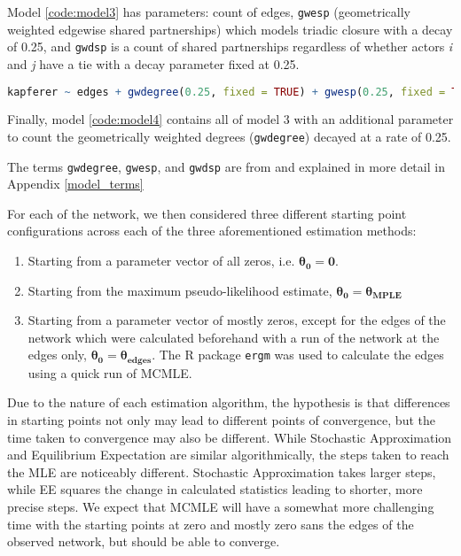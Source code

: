 Model \ref{code:model3} has parameters: count of edges, \texttt{gwesp} (geometrically weighted edgewise shared partnerships) which models triadic closure with a decay of 0.25, and \texttt{gwdsp} is a count of shared partnerships regardless of whether actors \textit{i} and \textit{j} have a tie with a decay parameter fixed at 0.25.

\begin{lstlisting}[language=R, label = {code:model4}]
kapferer ~ edges + gwdegree(0.25, fixed = TRUE) + gwesp(0.25, fixed = TRUE) + gwdsp(0.25, fixed = TRUE)
\end{lstlisting}

Finally, model \ref{code:model4} contains all of model 3 with an additional parameter to count the geometrically weighted degrees (\texttt{gwdegree}) decayed at a rate of 0.25.

The terms \texttt{gwdegree}, \texttt{gwesp}, and \texttt{gwdsp} are from \cite{hunter2007} and explained in more detail in Appendix \ref{model_terms}

For each of the network, we then considered three different starting point configurations across each of the three aforementioned estimation methods:
\begin{enumerate}
\item Starting from a parameter vector of all zeros, i.e. $\boldsymbol{\theta_0} = \boldsymbol{0}$.
\item Starting from the maximum pseudo-likelihood estimate, $\boldsymbol{\theta_0} = \boldsymbol{\theta_{MPLE}}$
\item Starting from a parameter vector of mostly zeros, except for the edges of the network which were calculated beforehand with a run of the network at the edges only, $\boldsymbol{\theta_0} = \boldsymbol{\theta_{edges}}$. The R package \texttt{ergm} was used to calculate the edges using a quick run of MCMLE.
\end{enumerate}

Due to the nature of each estimation algorithm, the hypothesis is that differences in starting points not only may lead to different points of convergence, but the time taken to convergence may also be different. While Stochastic Approximation and Equilibrium Expectation are similar algorithmically, the steps taken to reach the MLE are noticeably different. Stochastic Approximation takes larger steps, while EE squares the change in calculated statistics leading to shorter, more precise steps. We expect that MCMLE will have a somewhat more challenging time with the starting points at zero and mostly zero sans the edges of the observed network, but should be able to converge.

